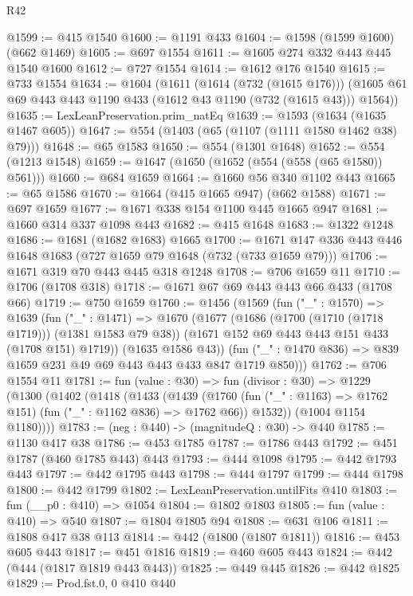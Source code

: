 \begin{lexlean}{R42}
\begin{coremodule}
@1599 := @415 @1540
@1600 := @1191 @433
@1604 := @1598 (@1599 @1600) (@662 @1469)
@1605 := @697 @1554
@1611 := @1605 @274 @332 @443 @445 @1540 @1600
@1612 := @727 @1554
@1614 := @1612 @176 @1540
@1615 := @733 @1554
@1634 := @1604
    (@1611
      (@1614 (@732 (@1615 @176)))
      (@1605 @61 @69 @443 @443 @1190 @433 (@1612 @43 @1190 (@732 (@1615 @43))) @1564))
@1635 := LexLeanPreservation.prim_natEq
@1639 := @1593 (@1634 (@1635 @1467 @605))
@1647 := @554 (@1403 (@65 (@1107 (@1111 @1580 @1462 @38) @79)))
@1648 := @65 @1583
@1650 := @554 (@1301 @1648)
@1652 := @554 (@1213 @1548)
@1659 := @1647 (@1650 (@1652 (@554 (@558 (@65 @1580)) @561)))
@1660 := @684 @1659
@1664 := @1660 @56 @340 @1102 @443
@1665 := @65 @1586
@1670 := @1664 (@415 @1665 @947) (@662 @1588)
@1671 := @697 @1659
@1677 := @1671 @338 @154 @1100 @445 @1665 @947
@1681 := @1660 @314 @337 @1098 @443
@1682 := @415 @1648
@1683 := @1322 @1248
@1686 := @1681 (@1682 @1683) @1665
@1700 := @1671 @147 @336 @443 @446 @1648 @1683 (@727 @1659 @79 @1648 (@732 (@733 @1659 @79)))
@1706 := @1671 @319 @70 @443 @445 @318 @1248
@1708 := @706 @1659 @11
@1710 := @1706 (@1708 @318)
@1718 := @1671 @67 @69 @443 @443 @66 @433 (@1708 @66)
@1719 := @750 @1659
@1760 := @1456
    (@1569
      (fun ("_" : @1570) =>
      @1639
        (fun ("_" : @1471) =>
        @1670
          (@1677
            (@1686 (@1700 (@1710 (@1718 @1719))) (@1381 @1583 @79 @38))
            (@1671 @152 @69 @443 @443 @151 @433 (@1708 @151) @1719))
          (@1635 @1586 @43))
        (fun ("_" : @1470 @836) => @839 @1659 @231 @49 @69 @443 @443 @433 @847 @1719 @850)))
@1762 := @706 @1554 @11
@1781 := fun (value : @30) =>
  fun (divisor : @30) =>
  @1229
    (@1300
      (@1402
        (@1418
          (@1433
            (@1439
              (@1760 (fun ("_" : @1163) => @1762 @151) (fun ("_" : @1162 @836) => @1762 @66))
              @1532))
          (@1004 @1154 @1180))))
@1783 := (neg : @440) -> (magnitudeQ : @30) -> @440
@1785 := @1130 @417 @38
@1786 := @453 @1785
@1787 := @1786 @443
@1792 := @451 @1787 (@460 @1785 @443) @443
@1793 := @444 @1098
@1795 := @442 @1793 @443
@1797 := @442 @1795 @443
@1798 := @444 @1797
@1799 := @444 @1798
@1800 := @442 @1799
@1802 := LexLeanPreservation.untilFits @410
@1803 := fun (__p0 : @410) => @1054
@1804 := @1802 @1803
@1805 := fun (value : @410) => @540
@1807 := @1804 @1805 @94
@1808 := @631 @106
@1811 := @1808 @417 @38 @113
@1814 := @442 (@1800 (@1807 @1811))
@1816 := @453 @605 @443
@1817 := @451 @1816
@1819 := @460 @605 @443
@1824 := @442 (@444 (@1817 @1819 @443 @443))
@1825 := @449 @445
@1826 := @442 @1825
@1829 := Prod.fst.{0, 0} @410 @440

\end{coremodule}
\end{lexlean}
